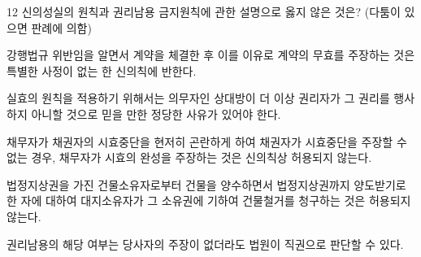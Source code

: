 \begin{question}{12}
신의성실의 원칙과 권리남용 금지원칙에 관한 설명으로 옳지 않은 것은? (다툼이 있으면 판례에 의함)
\begin{choices}
  \item 강행법규 위반임을 알면서 계약을 체결한 후 이를 이유로 계약의 무효를 주장하는 것은 특별한 사정이 없는 한 신의칙에 반한다.
  \item 실효의 원칙을 적용하기 위해서는 의무자인 상대방이 더 이상 권리자가 그 권리를 행사하지 아니할 것으로 믿을 만한 정당한 사유가 있어야 한다.
  \item 채무자가 채권자의 시효중단을 현저히 곤란하게 하여 채권자가 시효중단을 주장할 수 없는 경우, 채무자가 시효의 완성을 주장하는 것은 신의칙상 허용되지 않는다.
  \item 법정지상권을 가진 건물소유자로부터 건물을 양수하면서 법정지상권까지 양도받기로 한 자에 대하여 대지소유자가 그 소유권에 기하여 건물철거를 청구하는 것은 허용되지 않는다.
  \item 권리남용의 해당 여부는 당사자의 주장이 없더라도 법원이 직권으로 판단할 수 있다.
\end{choices}
\end{question}
